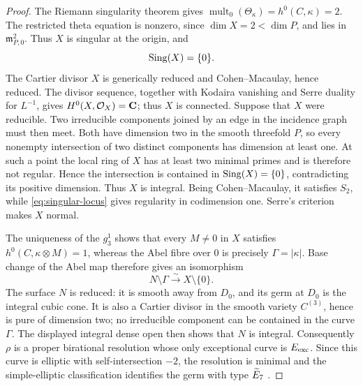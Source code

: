 \begin{proof}
The Riemann singularity theorem \cite{Kempf1973} gives
$\operatorname{mult}_0(\Theta_\kappa)=h^0(C,\kappa)=2$.  The restricted
theta equation is nonzero, since $\dim X=2<\dim P$, and lies in
$\mathfrak m_{P,0}^2$.  Thus $X$ is singular at the origin, and
\begin{equation}
 \operatorname{Sing}(X)=\{0\}.
\label{eq:singular-locus}
\end{equation}
The Cartier divisor $X$ is generically reduced and Cohen--Macaulay, hence
reduced.  The divisor sequence, together with Kodaira vanishing and Serre
duality for $L^{-1}$, gives $H^0(X,\mathcal O_X)=\mathbf C$; thus $X$ is
connected.  Suppose that $X$ were
reducible.  Two irreducible components joined by an edge in the incidence
graph must then meet.  Both have dimension two in the smooth threefold $P$,
so every nonempty intersection of two distinct components has dimension at
least one.  At such a point the local ring of $X$ has at least two minimal
primes and is therefore not regular.  Hence the intersection is contained in
$\operatorname{Sing}(X)=\{0\}$, contradicting its positive dimension.  Thus $X$ is
integral.  Being Cohen--Macaulay, it satisfies $S_2$, while
\eqref{eq:singular-locus} gives regularity in codimension one.  Serre's
criterion makes $X$ normal.

The uniqueness of the $g^1_3$ shows that every $M\ne0$ in $X$ satisfies
$h^0(C,\kappa\otimes M)=1$, whereas the Abel fibre over $0$ is precisely
$\Gamma=|\kappa|$.  Base change of the Abel map therefore gives an
isomorphism
\[
 N\setminus\Gamma\xrightarrow{\sim}X\setminus\{0\}.
\]
The surface $N$ is reduced: it is smooth away from $D_0$, and its germ at
$D_0$ is the integral cubic cone.  It is also a Cartier divisor in the
smooth variety $C^{(3)}$, hence is pure of dimension two; no irreducible
component can be contained in the curve $\Gamma$.  The displayed integral
dense open then shows that $N$ is integral.  Consequently $\rho$ is a
proper birational resolution whose only exceptional curve is $E_{\mathrm{exc}}$.
Since this curve is elliptic with self-intersection $-2$, the resolution is
minimal and the simple-elliptic classification identifies the germ with
type $\widetilde E_7$ \cite{Laufer1977,Pinkham1977}.
\end{proof}


